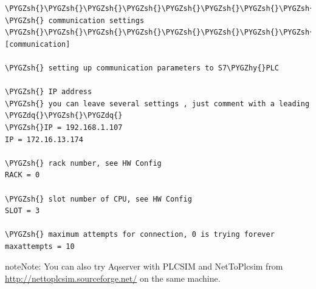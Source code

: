 \documentclass[a4paper,10pt,english]{sphinxmanual}
\def\PYGZsh{\char`\#}
\def\PYGZhy{\char`\-}
\def\PYGZdq{\char`\"}
\begin{document}
\begin{Verbatim}[commandchars=\\\{\}]
\PYGZsh{}\PYGZsh{}\PYGZsh{}\PYGZsh{}\PYGZsh{}\PYGZsh{}\PYGZsh{}\PYGZsh{}\PYGZsh{}\PYGZsh{}\PYGZsh{}\PYGZsh{}\PYGZsh{}\PYGZsh{}\PYGZsh{}\PYGZsh{}\PYGZsh{}\PYGZsh{}\PYGZsh{}\PYGZsh{}\PYGZsh{}\PYGZsh{}\PYGZsh{}\PYGZsh{}\PYGZsh{}\PYGZsh{}\PYGZsh{}\PYGZsh{}\PYGZsh{}\PYGZsh{}\PYGZsh{}\PYGZsh{}\PYGZsh{}\PYGZsh{}\PYGZsh{}\PYGZsh{}\PYGZsh{}\PYGZsh{}\PYGZsh{}\PYGZsh{}\PYGZsh{}\PYGZsh{}\PYGZsh{}\PYGZsh{}\PYGZsh{}\PYGZsh{}\PYGZsh{}\PYGZsh{}\PYGZsh{}\PYGZsh{}\PYGZsh{}\PYGZsh{}\PYGZsh{}\PYGZsh{}\PYGZsh{}\PYGZsh{}\PYGZsh{}\PYGZsh{}\PYGZsh{}\PYGZsh{}\PYGZsh{}\PYGZsh{}\PYGZsh{}\PYGZsh{}\PYGZsh{}\PYGZsh{}\PYGZsh{}\PYGZsh{}\PYGZsh{}\PYGZsh{}\PYGZsh{}\PYGZsh{}
\PYGZsh{} communication settings
\PYGZsh{}\PYGZsh{}\PYGZsh{}\PYGZsh{}\PYGZsh{}\PYGZsh{}\PYGZsh{}\PYGZsh{}\PYGZsh{}\PYGZsh{}\PYGZsh{}\PYGZsh{}\PYGZsh{}\PYGZsh{}\PYGZsh{}\PYGZsh{}\PYGZsh{}\PYGZsh{}\PYGZsh{}\PYGZsh{}\PYGZsh{}\PYGZsh{}\PYGZsh{}\PYGZsh{}\PYGZsh{}\PYGZsh{}\PYGZsh{}\PYGZsh{}\PYGZsh{}\PYGZsh{}\PYGZsh{}\PYGZsh{}\PYGZsh{}\PYGZsh{}\PYGZsh{}\PYGZsh{}\PYGZsh{}\PYGZsh{}\PYGZsh{}\PYGZsh{}\PYGZsh{}\PYGZsh{}\PYGZsh{}\PYGZsh{}\PYGZsh{}\PYGZsh{}\PYGZsh{}\PYGZsh{}\PYGZsh{}\PYGZsh{}\PYGZsh{}\PYGZsh{}\PYGZsh{}\PYGZsh{}\PYGZsh{}\PYGZsh{}\PYGZsh{}\PYGZsh{}\PYGZsh{}\PYGZsh{}\PYGZsh{}\PYGZsh{}\PYGZsh{}\PYGZsh{}\PYGZsh{}\PYGZsh{}\PYGZsh{}\PYGZsh{}\PYGZsh{}\PYGZsh{}\PYGZsh{}\PYGZsh{}
[communication]

\PYGZsh{} setting up communication parameters to S7\PYGZhy{}PLC

\PYGZsh{} IP address
\PYGZsh{} you can leave several settings , just comment with a leading \PYGZdq{}\PYGZsh{}\PYGZdq{}
\PYGZsh{}IP = 192.168.1.107
IP = 172.16.13.174

\PYGZsh{} rack number, see HW Config
RACK = 0

\PYGZsh{} slot number of CPU, see HW Config
SLOT = 3

\PYGZsh{} maximum attempts for connection, 0 is trying forever
maxattempts = 10
\end{Verbatim}

\begin{notice}{note}{Note:}
You can also try Aqserver with PLCSIM and NetToPlcsim from \href{http://nettoplcsim.sourceforge.net/}{http://nettoplcsim.sourceforge.net/} on the same machine.
\end{notice}
\end{document}
